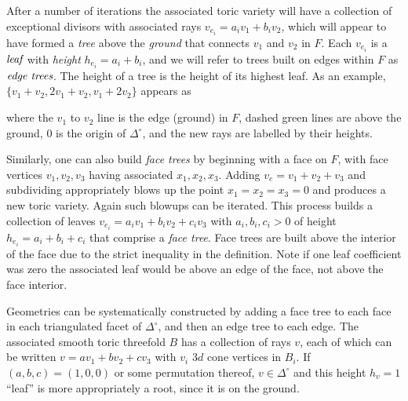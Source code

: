 \documentclass[aps,prl,twocolumn, superscriptaddress,groupedaddress,nofootinbib]{revtex4-1}
\begin{document}
After a number of iterations the associated toric variety will have a
collection of exceptional divisors with associated rays $v_{e_i}=a_i v_1 + b_i
v_2$, which will appear to have formed a \emph{tree} above the \emph{ground}
that connects $v_1$ and $v_2$ in $F$. Each $v_{e_i}$ is a $\emph{leaf}$ with
\emph{height} $h_{e_i}=a_i+b_i$, and  we will refer to trees built on edges
within $F$ as $\emph{edge trees}$. The height of a tree is the height of its
highest leaf. As an example, $\{v_1+v_2,2v_1+v_2,v_1+2v_2\}$ appears as
\begin{center}  \end{center} where the $v_1$ to $v_2$ line is the
edge (ground) in $F$, dashed green lines are above the ground, $0$ is the origin of $\Delta^\circ$, and the new rays
are labelled by their heights.

Similarly, one can also build \emph{face trees} by beginning with a face on
$F$, with face vertices $v_1, v_2, v_3$ having associated $x_1, x_2, x_3$. Adding $v_e=v_1+v_2+v_3$ and subdividing
appropriately blows up the point $x_1=x_2=x_3=0$  and produces a new toric
variety. Again such blowups can be iterated. This process builds a collection
of leaves $v_{e_i}=a_i v_1 + b_i v_2 + c_i v_3$ with $a_i,b_i,c_i > 0$ of
height $h_{e_i}=a_i+b_i+c_i$ that comprise a \emph{face tree}. Face trees are
built above the interior of the face due to the strict inequality in the
definition. Note if one leaf coefficient was zero the associated leaf would be
above an edge of the face, not above the face interior.

Geometries can be systematically constructed by adding a face tree to each face in each triangulated facet of $\Delta^\circ$, and then an edge tree to each edge. The associated smooth toric
threefold $B$ has a collection of rays $v$, each of which can be written $v=av_1+bv_2+cv_3$ with $v_i$ $3d$ cone vertices in $B_i$. If $(a,b,c)=(1,0,0)$ or some
permutation thereof, $v\in \Delta^\circ$ and this height $h_v=1$ ``leaf'' is more
appropriately a root, since it is on the ground.
\end{document}
